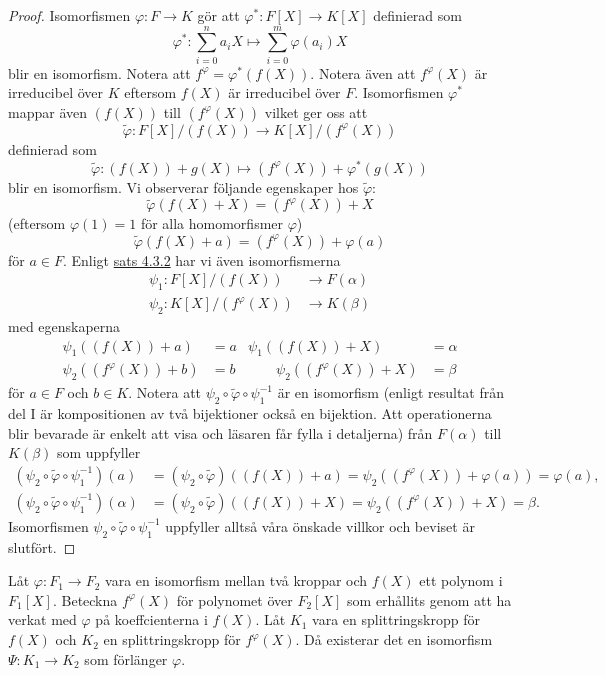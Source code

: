 \documentclass{article}
\theoremstyle{definition}
\begin{document}
\begin{proof}
  Isomorfismen $\varphi: F \rightarrow K$ gör att $\varphi^*: F[X] \rightarrow K[X]$ definierad som 
  \[\varphi^*: \sum_{i = 0}^n a_iX \mapsto \sum_{i = 0}^m \varphi(a_i)X\]
  blir en isomorfism. Notera att $f^{\varphi} = \varphi^*(f(X)).$ Notera även att $f^{\varphi}(X)$ är irreducibel över $K$ eftersom $f(X)$ är irreducibel över $F$.
  Isomorfismen $\varphi^*$ mappar även $(f(X))$ till $(f^{\varphi}(X))$ vilket ger oss att
  \[\tilde{\varphi}: F[X]/(f(X)) \rightarrow K[X]/(f^{\varphi}(X))\]
  definierad som 
  \[\tilde{\varphi}: (f(X)) + g(X) \mapsto (f^{\varphi}(X)) + \varphi^*(g(X))\]
  blir en isomorfism. Vi observerar följande egenskaper hos $\tilde{\varphi}$:
  \[\tilde{\varphi}(f(X) + X) = (f^{\varphi}(X)) + X\]
  (eftersom $\varphi(1) = 1$ för alla homomorfismer $\varphi$)
  \[\tilde{\varphi}(f(X) + a) = (f^{\varphi}(X)) + \varphi(a)\]
  för $a \in F$. Enligt \hyperlink{5.3.2}{sats 4.3.2} har vi även isomorfismerna 
  \begin{align*}
    \psi_1: F[X]/(f(X)) &\rightarrow F(\alpha) \\
    \psi_2: K[X]/(f^{\varphi}(X)) &\rightarrow K(\beta)
  \end{align*}
  med egenskaperna
  \begin{align*}
    \psi_1((f(X)) + a) &= a           & \psi_1((f(X)) + X) &= \alpha \\
    \psi_2((f^{\varphi}(X)) + b) &= b & \qquad \psi_2((f^{\varphi}(X)) + X) &= \beta
  \end{align*}
  för $a \in F$ och $b \in K.$ Notera att $\psi_2 \circ \tilde{\varphi} \circ \psi_1^{-1}$ är en isomorfism (enligt resultat från del I är 
  kompositionen av två bijektioner också en bijektion. Att operationerna blir bevarade är enkelt att visa och läsaren får fylla i detaljerna)
  från $F(\alpha)$ till $K(\beta)$ som uppfyller 
  \begin{align*}
    (\psi_2 \circ \tilde{\varphi} \circ \psi_1^{-1}) (a) &= (\psi_2 \circ \tilde{\varphi}) ( (f(X)) + a) = \psi_2 ((f^{\varphi}(X)) + \varphi(a)) = \varphi(a), \\
    (\psi_2 \circ \tilde{\varphi} \circ \psi_1^{-1}) (\alpha) &= (\psi_2 \circ \tilde{\varphi}) ((f(X)) + X) = \psi_2((f^{\varphi}(X)) + X) = \beta.
  \end{align*}
  Isomorfismen $\psi_2 \circ \tilde{\varphi} \circ \psi_1^{-1}$ uppfyller alltså våra önskade villkor och beviset är slutfört.
\end{proof}

\hypertarget{sats6.0.1}{}
\begin{mytheo}{}{}
  Låt $\varphi: F_1 \rightarrow F_2$ vara en isomorfism mellan två kroppar och $f(X)$ ett polynom i $F_1[X]$. Beteckna 
  $f^{\varphi}(X)$ för polynomet över $F_2[X]$ som erhållits genom att ha verkat med $\varphi$ på koeffcienterna i $f(X)$. Låt 
  $K_1$ vara en splittringskropp för $f(X)$ och $K_2$ en splittringskropp för $f^{\varphi}(X).$ Då existerar det en isomorfism $\Psi: K_1 \rightarrow K_2$
  som förlänger $\varphi.$
\end{mytheo}
\end{document}
